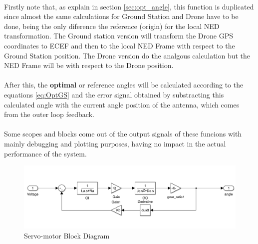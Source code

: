 \paragraph{}Firstly note that, as explain in section \ref{sec:opt_angle}, this function is duplicated since almost the same calculations for Ground Station and Drone have to be done, being the only diference the reference (origin) for the local NED transformation.
The Ground station version will transform the Drone GPS coordinates to ECEF and then to the local NED Frame with respect to the Ground Station position. The Drone version do the analgous calculation but the NED Frame will be with respect to the Drone position.

\paragraph{}After this, the \textbf{optimal} or {reference} angles will be calculated according to the equations \ref{eq:OptGS} and the error signal obtained by substracting this calculated angle with the current angle position of the antenna, which comes from the outer loop feedback.

\paragraph{} Some scopes and blocks come out of the output signals of these funcions with mainly debugging and plotting purposes, having no impact in the actual performance of the system. 

\begin{figure}[h]
	\centering
	\includegraphics[width=1\textwidth]{figures/servomotor_3D.png}
	\caption{Servo-motor Block Diagram}
   	\label{fig:servomotor3D}
\end{figure}

\clearpage


